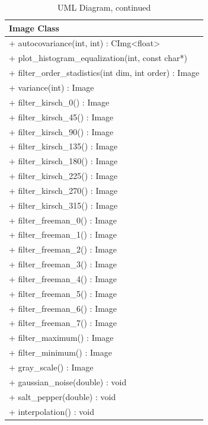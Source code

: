 \documentclass[a4paper]{article}
\begin{document}
\begin{table}[H]
	\label{UML2}
    \caption{UML Diagram, continued}
	\centering
    
	\begin{tabular}[15cm]{ 
    >{\arraybackslash}m{15cm}}
        \toprule 

		\large{Image Class} \\   

		\midrule
 		+ autocovariance(int, int) : CImg<float> \\
		+ plot\_histogram\_equalization(int, const char*) \\
        + filter\_order\_stadistics(int dim, int order) : Image \\
		+ variance(int) : Image \\
        + filter\_kirsch\_0() : Image \\
		+ filter\_kirsch\_45() : Image \\
        + filter\_kirsch\_90() : Image \\
        + filter\_kirsch\_135() : Image \\
        + filter\_kirsch\_180() : Image \\
        + filter\_kirsch\_225() : Image \\
        + filter\_kirsch\_270() : Image \\
        + filter\_kirsch\_315() : Image \\
        + filter\_freeman\_0() : Image \\
        + filter\_freeman\_1() : Image \\
        + filter\_freeman\_2() : Image \\
        + filter\_freeman\_3() : Image \\
        + filter\_freeman\_4() : Image \\
        + filter\_freeman\_5() : Image \\
        + filter\_freeman\_6() : Image \\
        + filter\_freeman\_7() : Image \\
        + filter\_maximum() : Image \\
        + filter\_minimum() : Image \\
        + gray\_scale() : Image \\
        + gaussian\_noise(double) : void \\
        + salt\_pepper(double) : void \\
        + interpolation() : void \\
        
        \bottomrule
        
 
	\end{tabular}
    
\end{table}
\end{document}

